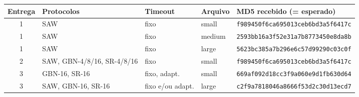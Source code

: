 \documentclass[11pt,a4paper]{article}
\begin{document}
\begin{table}[H]
\centering\footnotesize
\setlength{\tabcolsep}{4pt}
\begin{tabular}{@{}c l l l l@{}}
\toprule
\textbf{Entrega} & \textbf{Protocolos} & \textbf{Timeout} & \textbf{Arquivo} & \textbf{MD5 recebido (= esperado)}\\
\midrule
1 & SAW & fixo & small  & \texttt{f989450f6ca695013ceb6bd3a5f6417c}\\
1 & SAW & fixo & medium & \texttt{2593bb16a3f52e31a7b8773450e8da8b}\\
1 & SAW & fixo & large  & \texttt{5623bc385a7b296e6c57d99290c03c0f}\\
2 & SAW, GBN-4/8/16, SR-4/8/16 & fixo & small  & \texttt{f989450f6ca695013ceb6bd3a5f6417c}\\
3 & GBN-16, SR-16 & fixo, adapt. & small  & \texttt{669af092d18cc3f9a060e9d1fb630d64}\\
3 & SAW, GBN-16, SR-16 & fixo e/ou adapt. & large  & \texttt{c2f9a7818046a8666f53d2c30d13ecd7}\\
\bottomrule
\end{tabular}
\end{table}
\end{document}
